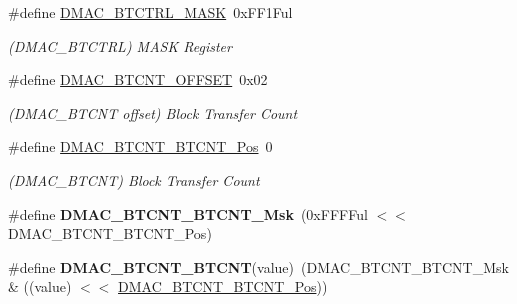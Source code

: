 \begin{DoxyCompactItemize}
\item 
\hypertarget{group___s_a_m_l21___d_m_a_c_ga0d1512d97a8147c95f766bd6b04070e1}{}\#define \hyperlink{group___s_a_m_l21___d_m_a_c_ga0d1512d97a8147c95f766bd6b04070e1}{D\+M\+A\+C\+\_\+\+B\+T\+C\+T\+R\+L\+\_\+\+M\+A\+S\+K}~0x\+F\+F1\+Ful\label{group___s_a_m_l21___d_m_a_c_ga0d1512d97a8147c95f766bd6b04070e1}

\begin{DoxyCompactList}\small\item\em (D\+M\+A\+C\+\_\+\+B\+T\+C\+T\+R\+L) M\+A\+S\+K Register \end{DoxyCompactList}\item 
\hypertarget{group___s_a_m_l21___d_m_a_c_gaf1d993ae92feed10a243994e9832ee27}{}\#define \hyperlink{group___s_a_m_l21___d_m_a_c_gaf1d993ae92feed10a243994e9832ee27}{D\+M\+A\+C\+\_\+\+B\+T\+C\+N\+T\+\_\+\+O\+F\+F\+S\+E\+T}~0x02\label{group___s_a_m_l21___d_m_a_c_gaf1d993ae92feed10a243994e9832ee27}

\begin{DoxyCompactList}\small\item\em (D\+M\+A\+C\+\_\+\+B\+T\+C\+N\+T offset) Block Transfer Count \end{DoxyCompactList}\item 
\hypertarget{group___s_a_m_l21___d_m_a_c_gafce48654ec425cf0d3c01e6b8d766945}{}\#define \hyperlink{group___s_a_m_l21___d_m_a_c_gafce48654ec425cf0d3c01e6b8d766945}{D\+M\+A\+C\+\_\+\+B\+T\+C\+N\+T\+\_\+\+B\+T\+C\+N\+T\+\_\+\+Pos}~0\label{group___s_a_m_l21___d_m_a_c_gafce48654ec425cf0d3c01e6b8d766945}

\begin{DoxyCompactList}\small\item\em (D\+M\+A\+C\+\_\+\+B\+T\+C\+N\+T) Block Transfer Count \end{DoxyCompactList}\item 
\hypertarget{group___s_a_m_l21___d_m_a_c_ga5782a95fe2f03ef099907901c9abf32b}{}\#define {\bfseries D\+M\+A\+C\+\_\+\+B\+T\+C\+N\+T\+\_\+\+B\+T\+C\+N\+T\+\_\+\+Msk}~(0x\+F\+F\+F\+Ful $<$$<$ D\+M\+A\+C\+\_\+\+B\+T\+C\+N\+T\+\_\+\+B\+T\+C\+N\+T\+\_\+\+Pos)\label{group___s_a_m_l21___d_m_a_c_ga5782a95fe2f03ef099907901c9abf32b}

\item 
\hypertarget{group___s_a_m_l21___d_m_a_c_ga623b5a6ab529d933a20cb283eb13dc2a}{}\#define {\bfseries D\+M\+A\+C\+\_\+\+B\+T\+C\+N\+T\+\_\+\+B\+T\+C\+N\+T}(value)~(D\+M\+A\+C\+\_\+\+B\+T\+C\+N\+T\+\_\+\+B\+T\+C\+N\+T\+\_\+\+Msk \& ((value) $<$$<$ \hyperlink{group___s_a_m_l21___d_m_a_c_gafce48654ec425cf0d3c01e6b8d766945}{D\+M\+A\+C\+\_\+\+B\+T\+C\+N\+T\+\_\+\+B\+T\+C\+N\+T\+\_\+\+Pos}))\label{group___s_a_m_l21___d_m_a_c_ga623b5a6ab529d933a20cb283eb13dc2a}


\end{DoxyCompactItemize}
